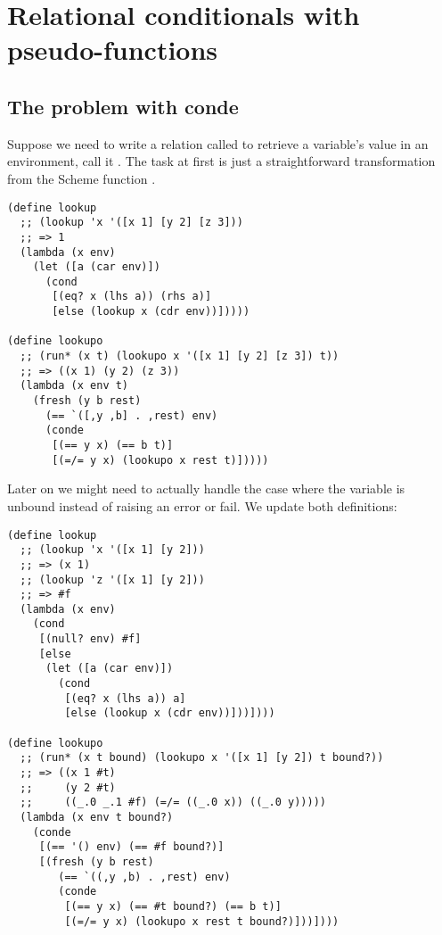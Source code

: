 \section{Relational conditionals with pseudo-functions}\label{reif}
\subsection{The problem with conde}
Suppose we need to write a relation called to retrieve a variable's value in an environment, call it . The task at first is just a straightforward transformation from the Scheme function .
\begin{lstlisting}
(define lookup
  ;; (lookup 'x '([x 1] [y 2] [z 3]))
  ;; => 1
  (lambda (x env)
    (let ([a (car env)])
      (cond
       [(eq? x (lhs a)) (rhs a)]
       [else (lookup x (cdr env))]))))

(define lookupo
  ;; (run* (x t) (lookupo x '([x 1] [y 2] [z 3]) t))
  ;; => ((x 1) (y 2) (z 3))
  (lambda (x env t)
    (fresh (y b rest)
      (== `([,y ,b] . ,rest) env)
      (conde
       [(== y x) (== b t)]
       [(=/= y x) (lookupo x rest t)]))))
\end{lstlisting}

Later on we might need to actually handle the case where the variable is unbound instead of raising an error or fail. We update both definitions:
\begin{lstlisting}
(define lookup
  ;; (lookup 'x '([x 1] [y 2]))
  ;; => (x 1)
  ;; (lookup 'z '([x 1] [y 2]))
  ;; => #f
  (lambda (x env)
    (cond
     [(null? env) #f]
     [else
      (let ([a (car env)])
        (cond
         [(eq? x (lhs a)) a]
         [else (lookup x (cdr env))]))])))

(define lookupo
  ;; (run* (x t bound) (lookupo x '([x 1] [y 2]) t bound?))
  ;; => ((x 1 #t)
  ;;     (y 2 #t)
  ;;     ((_.0 _.1 #f) (=/= ((_.0 x)) ((_.0 y)))))
  (lambda (x env t bound?)
    (conde
     [(== '() env) (== #f bound?)]
     [(fresh (y b rest)
        (== `((,y ,b) . ,rest) env)
        (conde
         [(== y x) (== #t bound?) (== b t)]
         [(=/= y x) (lookupo x rest t bound?)]))])))
\end{lstlisting}

